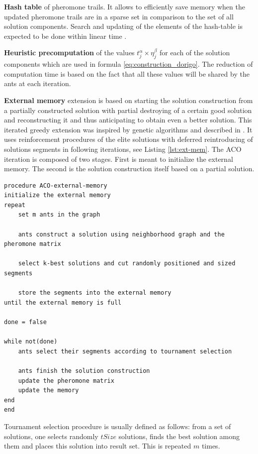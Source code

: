 \documentclass[11pt,a4paper,oneside]{book}
\begin{document}
\textbf{Hash table} of pheromone trails. It allows to efficiently save memory when the updated pheromone trails are in a sparse set in comparison to the set of all solution components. Search and updating of the elements of the hash-table is expected to be done within linear time \cite{DBLP:conf/gecco/AlbaC07}.

\textbf{Heuristic precomputation} of the values $t_j^\alpha \times \eta_j^\beta$ for each of the solution components which are used in formula \eqref{eq:construction_dorigo}. The reduction of computation time is based on the fact that all these values will be shared by the ants at each iteration.

\textbf{External memory} extension is based on starting the solution construction from a partially constructed solution with partial destroying of a certain good solution and reconstructing it and thus anticipating to obtain even a better solution. This iterated greedy extension was inspired by genetic algorithms and described in \cite{10.1007/978-3-540-28646-2_7}. It uses reinforcement procedures of the elite solutions with deferred reintroducing of solutions segments in following iterations, see Listing \ref{lst:ext-mem}. The ACO iteration is composed of two stages. First is meant to initialize the external memory. The second is the solution construction itself based on a partial solution. 

\begin{minipage}[c, breaklines=true]{0.95\textwidth}
\begin{lstlisting}[caption={External memory iteration pseudo-code}, label={lst:ext-mem}]
procedure ACO-external-memory
initialize the external memory
repeat
	set m ants in the graph
	
	ants construct a solution using neighborhood graph and the pheromone matrix
	
	select k-best solutions and cut randomly positioned and sized segments
	
	store the segments into the external memory
until the external memory is full

done = false

while not(done)
	ants select their segments according to tournament selection
	
	ants finish the solution construction
	update the pheromone matrix
	update the memory
end
end
\end{lstlisting}
\end{minipage}

Tournament selection procedure is usually defined as follows: from a set of solutions, one selects randomly $tSize$ solutions, finds the best solution among them and places this solution into result set. This is repeated $m$ times.
\end{document}
